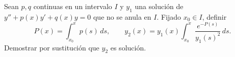 Sean \(p,q\) continuas en un intervalo \(I\) y \(y_1\) una solución de
\(y''+p(x)y'+q(x)y=0\) que no se anula en \(I\). Fijado \(x_0\in I\), definir
\[P(x)=\int_{x_0}^x p(s)\,ds,\qquad
y_2(x)=y_1(x)\int_{x_0}^x\frac{e^{-P(s)}}{y_1(s)^2}\,ds.\]
Demostrar por sustitución que \(y_2\) es solución.
